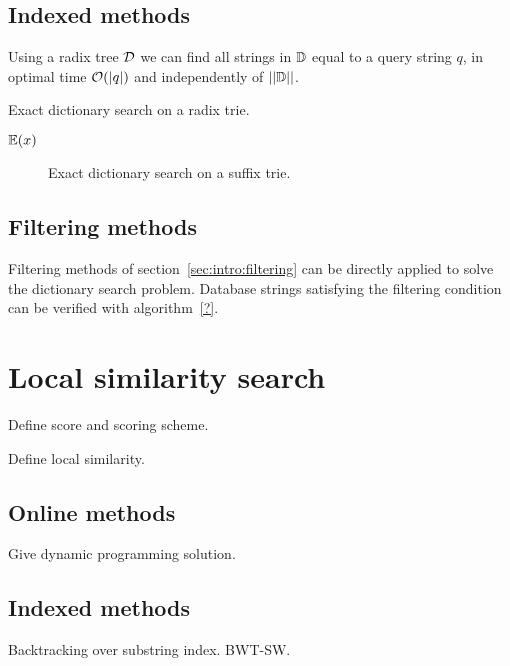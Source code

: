 \subsection{Indexed methods}

Using a radix tree $\mathcal {D}$ we can find all strings in $\mathbb {D}$ equal to a query string $q$, in optimal time $\mathcal{O}(|q|)$ and independently of $||\mathbb {D}||$.

\begin{algorithm}[h]
\caption{Exact dictionary search on a radix trie.}
\label{alg:dict-exact}
\begin{algorithmic}[1]
		\State \Report $\mathbb {E}(x)$
		\State {}
	\EndIf
\EndProcedure
\end{algorithmic}
\end{algorithm}

\begin{figure}[h]
\begin{center}
\caption{Exact dictionary search on a suffix trie.}
\label{fig:dict-exact}

\end{center}
\end{figure}

\subsection{Filtering methods}

Filtering methods of section~\ref{sec:intro:filtering} can be directly applied to solve the dictionary search problem. Database strings satisfying the filtering condition can be verified with algorithm~\ref{?}.



\section{Local similarity search}

Define score and scoring scheme.

Define local similarity.

\subsection{Online methods}
Give dynamic programming solution.

\subsection{Indexed methods}
Backtracking over substring index. BWT-SW.

